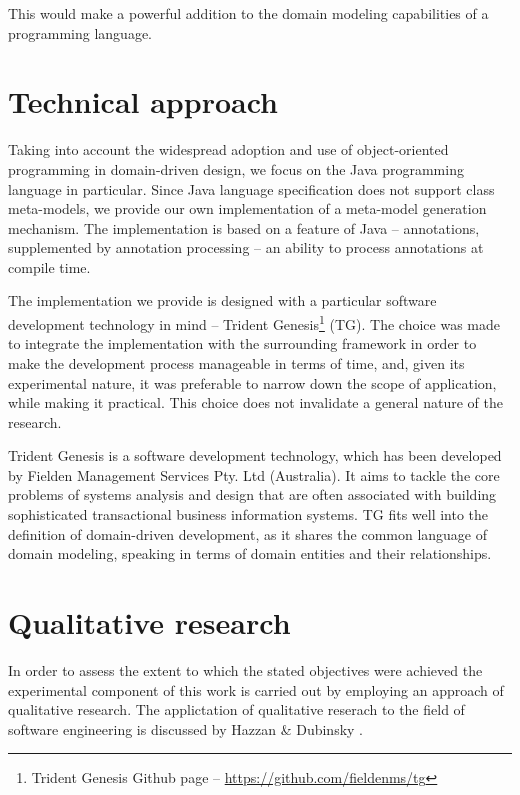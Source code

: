 This would make a powerful addition to the domain modeling capabilities of a programming language.

\section{Technical approach}
Taking into account the widespread adoption and use of object-oriented programming in domain-driven design, we focus on the Java programming language in particular.
Since Java language specification does not support class meta-models, we provide our own implementation of a meta-model generation mechanism. 
The implementation is based on a feature of Java -- annotations, supplemented by annotation processing -- an ability to process annotations at compile time.

\n

The implementation we provide is designed with a particular software development technology in mind – Trident Genesis\footnote{Trident Genesis Github page -- \url{https://github.com/fieldenms/tg}} (TG). The choice was made to integrate the implementation with the surrounding framework in order to make the development process manageable in terms of time, and, given its experimental nature, it was preferable to narrow down the scope of application, while making it practical. This choice does not invalidate a general nature of the research.

\n

Trident Genesis is a software development technology, which has been developed by Fielden Management Services Pty. Ltd (Australia).
It aims to tackle the core problems of systems analysis and design that are often associated with building sophisticated transactional business information systems.
TG fits well into the definition of domain-driven development, as it shares the common language of domain modeling, speaking in terms of domain entities and their relationships.

\section {Qualitative research}
In order to assess the extent to which the stated objectives were achieved the experimental component of this work is carried out by employing an approach of qualitative research.
The applictation of qualitative reserach to the field of software engineering is discussed by Hazzan \& Dubinsky \cite{hazzan}.

\n

